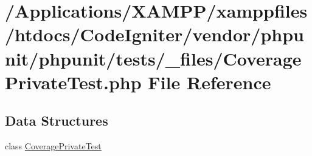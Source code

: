\hypertarget{phpunit_2tests_2__files_2_coverage_private_test_8php}{}\section{/\+Applications/\+X\+A\+M\+P\+P/xamppfiles/htdocs/\+Code\+Igniter/vendor/phpunit/phpunit/tests/\+\_\+files/\+Coverage\+Private\+Test.php File Reference}
\label{phpunit_2tests_2__files_2_coverage_private_test_8php}
\subsection*{Data Structures}
\begin{DoxyCompactItemize}
\item 
class \mbox{\hyperlink{class_coverage_private_test}{Coverage\+Private\+Test}}
\end{DoxyCompactItemize}
